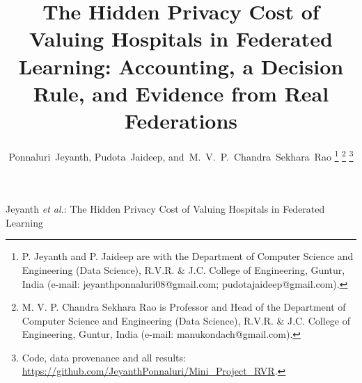 \documentclass[journal]{IEEEtran}
\begin{document}
\title{The Hidden Privacy Cost of Valuing Hospitals in Federated Learning: Accounting, a Decision Rule, and Evidence from Real Federations}

\author{Ponnaluri~Jeyanth,
        Pudota~Jaideep,
        and~M.~V.~P.~Chandra~Sekhara~Rao%
\thanks{P. Jeyanth and P. Jaideep are with the Department of Computer Science and Engineering (Data Science), R.V.R. \& J.C. College of Engineering, Guntur, India (e-mail: jeyanthponnaluri08@gmail.com; pudotajaideep@gmail.com).}%
\thanks{M. V. P. Chandra Sekhara Rao is Professor and Head of the Department of Computer Science and Engineering (Data Science), R.V.R. \& J.C. College of Engineering, Guntur, India (e-mail: manukondach@gmail.com).}%
\thanks{Code, data provenance and all results: \protect\url{https://github.com/JeyanthPonnaluri/Mini_Project_RVR}.}}

%
{Jeyanth \MakeLowercase{\textit{et al.}}: The Hidden Privacy Cost of Valuing Hospitals in Federated Learning}

\maketitle
\end{document}
